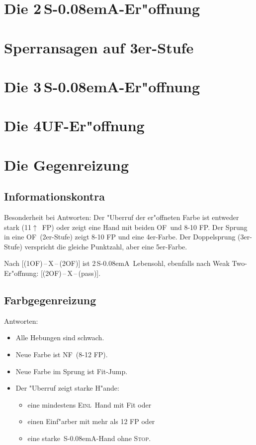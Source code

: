 \documentclass[11pt,german,twocolumn]{scrartcl}
\def\pl{$\uparrow$}
\def\ufa{\textsf{UF}}
\def\ofa{\textsf{OF}}
\def\sa{\textsf{S\kern-0.08emA}}
\def\SA{\,\sa}
\def\kontra{\textsf{X}}
\def\sep{\,--\,}
\def\inv{\textsc{Einl}}
\def\nf{\textsc{NF}}
\def\stp{\textsc{Stop}}
\begin{document}
\section{Die 2\SA-Er"offnung}

\section{Sperransagen auf 3er-Stufe}

\section{Die 3\SA-Er"offnung}

\section{Die 4\ufa-Er"offnung}

\section{Die Gegenreizung}

\subsection{Informationskontra}

Besonderheit bei Antworten: Der "Uberruf der er"offneten Farbe ist entweder
stark (11\pl\ FP) oder zeigt eine Hand mit beiden \ofa\ und 8-10 FP. Der Sprung
in eine \ofa\ (2er-Stufe) zeigt 8-10 FP und eine 4er-Farbe. Der Doppelsprung
(3er-Stufe) verspricht die gleiche Punktzahl, aber eine 5er-Farbe.

Nach [(1\ofa)\sep\kontra\sep(2\ofa)] ist 2\SA\ Lebensohl, ebenfalls nach Weak Two-
Er"offnung: [(2\ofa)\sep\kontra\sep(pass)].

\subsection{Farbgegenreizung}

Antworten:

\begin{itemize}
\item Alle Hebungen sind schwach.
\item Neue Farbe ist \nf\ (8-12 FP).
\item Neue Farbe im Sprung ist Fit-Jump.
\item Der "Uberruf zeigt starke H"ande:
  \begin{itemize}
  \item eine mindestens \inv\ Hand mit Fit oder
  \item einen Einf"arber mit mehr als 12 FP oder
  \item eine starke \SA-Hand ohne \stp.
  \end{itemize}
\end{itemize}
\end{document}
